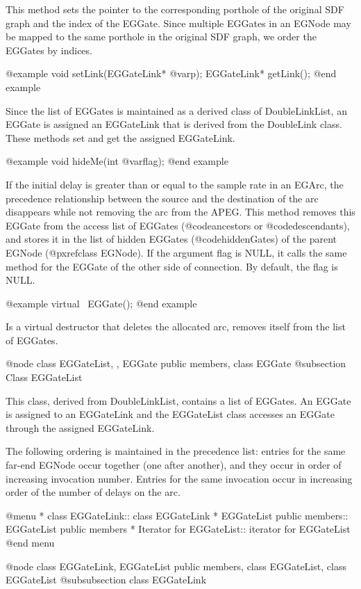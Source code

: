 This method sets the pointer to the corresponding porthole of the original
SDF graph and the index of the EGGate. Since multiple EGGates in an
EGNode may be mapped to the same porthole in the original SDF graph,
we order the EGGates by indices.

@example
void setLink(EGGateLink* @var{p});
EGGateLink* getLink();
@end example

Since the list of EGGates is maintained as a derived class of DoubleLinkList,
an EGGate is assigned an EGGateLink that is derived from the DoubleLink class.
These methods set and get the assigned EGGateLink.

@example
void hideMe(int @var{flag});
@end example

If the initial delay is greater than or equal to the sample rate in an EGArc,
the precedence relationship between the source and the destination of
the arc disappears while not removing the arc from the APEG. This method
removes this EGGate from the access list of EGGates (@code{ancestors} or
@code{descendants}), and stores it in
the list of hidden EGGates (@code{hiddenGates}) of the parent 
EGNode (@pxref{class EGNode}). 
If the argument flag is NULL,
it calls the same method for the EGGate of the other side of connection.
By default, the flag is NULL.

@example
virtual ~EGGate();
@end example

Is a virtual destructor that deletes the allocated arc, removes itself
from the list of EGGates.

@node class EGGateList, , EGGate public members, class EGGate
@subsection Class EGGateList

This class, derived from DoubleLinkList, contains a list of EGGates.
An EGGate is assigned to an EGGateLink and the EGGateList class
accesses an EGGate through the assigned EGGateLink. 

The following ordering is maintained in the precedence list:
entries for the same far-end
EGNode occur together (one after another), and they occur in order of
increasing invocation number. Entries for the same invocation occur in
increasing order of the number of delays on the arc.

@menu
* class EGGateLink::		class EGGateLink
* EGGateList public members::	EGGateList public members
* Iterator for EGGateList::	iterator for EGGateList
@end menu

@node class EGGateLink, EGGateList public members, class EGGateList, class EGGateList
@subsubsection class EGGateLink

